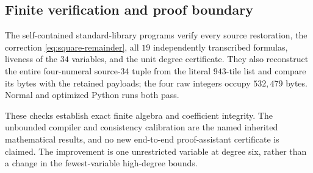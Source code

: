 \subsection{Finite verification and proof boundary}

The self-contained standard-library programs verify every source
restoration, the correction \eqref{eq:square-remainder}, all $19$
independently transcribed formulas, liveness of the $34$ variables, and the
unit degree certificate.  They also reconstruct the entire four-numeral
source-34 tuple from the literal $943$-tile list and compare its bytes with
the retained payloads; the four raw integers occupy $532{,}479$ bytes.
Normal and optimized Python runs both pass.

These checks establish exact finite algebra and coefficient integrity.
The unbounded compiler and consistency calibration are the named inherited
mathematical results, and no new end-to-end proof-assistant certificate is
claimed.  The improvement is one unrestricted variable at degree six,
rather than a change in the fewest-variable high-degree bounds.
